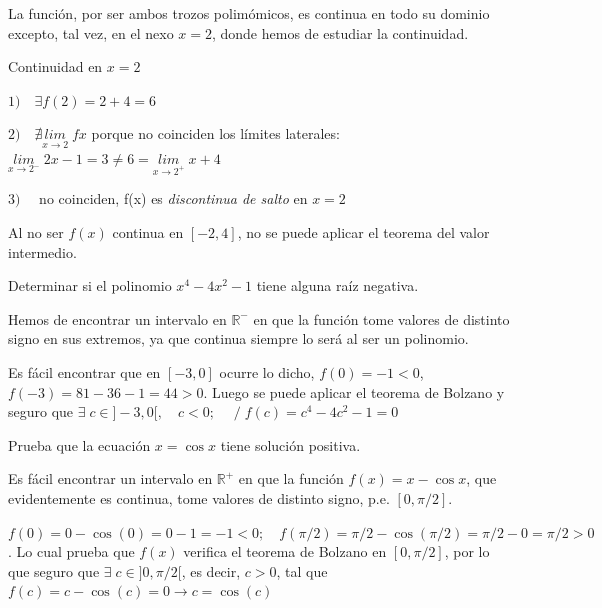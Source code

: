	\begin{proofw}\renewcommand{\qedsymbol}{$\diamond$}
		
	

	La función, por ser ambos trozos polimómicos, es continua en todo su dominio excepto, tal vez, en el nexo $x=2$, donde hemos de estudiar la continuidad.
	
	Continuidad en $x=2$
	
	$1)\quad \exists f(2)=2+4=6$
	
	$2)\quad \nexists \underset {x\to 2}{lim}\;{fx}$ porque no coinciden los límites laterales: $\underset{x\to 2^-}{lim}\;{2x-1}=3\neq 6 =\underset{x\to  2^+}{lim}\;{x+4}$
	
	$3) \quad $ no coinciden, f(x) es \emph{discontinua de salto} en $x=2$
	
	Al no ser $f(x)$ continua en $[-2,4]$, no se puede aplicar el teorema del valor intermedio.

	\end{proofw}
	
	\begin{ejre} Determinar si el polinomio $x^4-4x^2-1$ tiene alguna raíz negativa.		
	\end{ejre}
	
	\begin{proofw}\renewcommand{\qedsymbol}{$\diamond$}

	Hemos de encontrar un intervalo en $\mathbb R^-$ en que la función tome valores de distinto signo en sus extremos, ya que continua siempre lo será al ser un polinomio.
	
	Es fácil encontrar que en $[-3,0]$ ocurre lo dicho, $f(0)=-1<0$, $f(-3)=81-36-1=44>0$. Luego se puede aplicar el teorema de Bolzano y seguro que $\exists \; c \in ]-3,0[, \quad c<0;\quad \; / \; f(c)=c^4-4c^2-1=0$ 
	\end{proofw}
	
	\begin{ejre} Prueba que la ecuación $x=\cos x$ tiene solución positiva.		
	\end{ejre}
	
	\begin{proofw}\renewcommand{\qedsymbol}{$\diamond$}
	
	Es fácil encontrar un intervalo en $\mathbb R^+$ en que la función $f(x)=x-\cos x$, que evidentemente es continua, tome valores de distinto signo, p.e. $[0,\pi/2]$. 
	
	$f(0)=0-\cos (0)=0-1=-1<0; \quad f(\pi/2)=\pi/2-\cos(\pi/2)=\pi/2-0=\pi/2>0$. Lo cual prueba que $f(x)$ verifica el teorema de Bolzano en $[0,\pi/2]$, por lo que seguro que $\exists \; c \in ]0,\pi/2[$, es decir, $c>0$, tal que $f(c)=c-\cos(c)=0 \to c=\cos(c)$
	\end{proofw}
	
